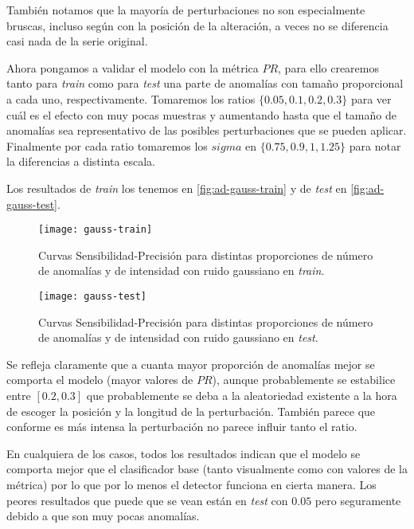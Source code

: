 También notamos que la mayoría de perturbaciones no son especialmente bruscas, incluso según con la posición de la alteración, a veces no se diferencia casi nada
de la serie original.

Ahora pongamos a validar el modelo con la métrica $PR$, para ello crearemos tanto para \emph{train} como para \emph{test} una parte de anomalías con tamaño proporcional a cada uno, respectivamente. Tomaremos los ratios $\{0.05, 0.1, 0.2, 0.3\}$ para ver cuál es el efecto con muy pocas muestras y aumentando hasta que el tamaño de anomalías sea representativo de las posibles perturbaciones que se pueden aplicar. Finalmente por cada ratio tomaremos los $sigma$ en $\{0.75, 0.9, 1, 1.25\}$ para notar la diferencias a distinta escala.

Los resultados de \emph{train} los tenemos en \autoref{fig:ad-gauss-train} y de \emph{test} en \autoref{fig:ad-gauss-test}.

\begin{figure}[htpb]
  \centering
  \texttt{[image: gauss-train]}
  \caption{Curvas Sensibilidad-Precisión para distintas proporciones de número de anomalías y de intensidad con ruido gaussiano en \emph{train}.}
  \label{fig:ad-gauss-train}
\end{figure}

\begin{figure}[htpb]
  \centering
  \texttt{[image: gauss-test]}
  \caption{Curvas Sensibilidad-Precisión para distintas proporciones de número de anomalías y de intensidad con ruido gaussiano en \emph{test}.}
  \label{fig:ad-gauss-test}
\end{figure}

Se refleja claramente que a cuanta mayor proporción de anomalías mejor se comporta el modelo (mayor valores de $PR$), aunque probablemente se estabilice entre $[0.2, 0.3]$ que probablemente se deba a la aleatoriedad existente a la hora de escoger la posición y la longitud de la perturbación. También parece que conforme es más intensa la perturbación no parece influir tanto el ratio.

En cualquiera de los casos, todos los resultados indican que el modelo se comporta mejor que el clasificador base (tanto visualmente como con valores de la métrica) por lo que por lo menos el detector funciona en cierta manera. Los peores resultados que puede que se vean están en \emph{test} con $0.05$ pero seguramente debido a que son muy pocas anomalías.

